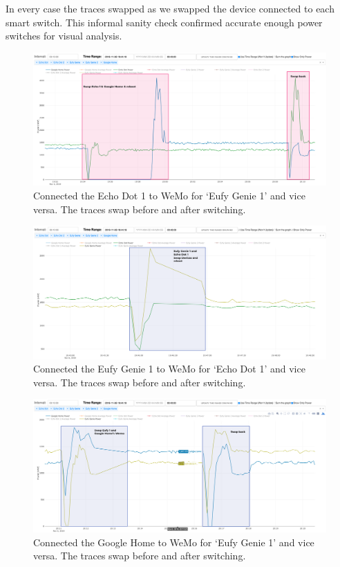 In every case the traces swapped as we swapped the device connected to each smart switch. This informal sanity check confirmed accurate enough power switches for visual analysis.

\begin{figure}[H]
    \centering
    \includegraphics[width=1\textwidth]{figures/swapEcho1Home.png}
    \caption{Connected the Echo Dot 1 to WeMo for `Eufy Genie 1' and vice versa. The traces swap before and after switching.}
    \label{fig:swapEcho1Home}
\end{figure}

\begin{figure}[H]
    \centering
    \includegraphics[width=1\textwidth]{figures/swapEufy1Echo1.png}
    \caption{Connected the Eufy Genie 1 to WeMo for `Echo Dot 1' and vice versa. The traces swap before and after switching.}
    \label{fig:swapEufy1Echo1}
\end{figure}

\begin{figure}[H]
    \centering
    \includegraphics[width=1\textwidth]{figures/swapEufy1Home.png}
    \caption{Connected the Google Home to WeMo for `Eufy Genie 1' and vice versa. The traces swap before and after switching.}
    \label{fig:swapEufy1Home}
\end{figure}


